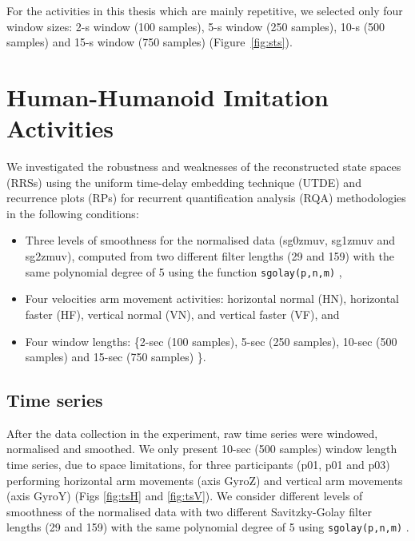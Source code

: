 For the activities in this thesis which are mainly repetitive, we selected 
only four window sizes: 2-s window (100 samples), 5-s window (250 samples), 
10-s (500 samples) and 15-s window (750 samples) (Figure~\ref{fig:sts}).




\section{Human-Humanoid Imitation Activities} %
We investigated the robustness and weaknesses of the reconstructed state spaces (RRSs) 
using the uniform time-delay embedding technique (UTDE) 
and recurrence plots (RPs) for recurrent quantification analysis (RQA) 
methodologies in the following conditions: 
\begin{itemize}

\item Three levels of smoothness for the normalised data (sg0zmuv, sg1zmuv and sg2zmuv), 
	computed from two different filter lengths (29 and 159) with the same polynomial degree 
	of 5 using the function \texttt{sgolay(p,n,m)} \cite{Rsignal},

\item Four velocities arm movement activities: 
	horizontal normal (HN), horizontal faster (HF), vertical normal (VN), and vertical faster (VF),
	and

\item Four window lengths: \{2-sec (100 samples), 5-sec (250 samples), 
	10-sec (500 samples) and 15-sec (750 samples) \}.

\end{itemize}





\subsection{Time series}
After the data collection in the experiment, raw time series were windowed, normalised and smoothed.
We only present 10-sec (500 samples) window length time series, due to space limitations, 
for three participants (p01, p01 and p03) performing horizontal arm movements (axis GyroZ) 
and vertical arm movements (axis GyroY) (Figs \ref{fig:tsH} and \ref{fig:tsV}).
We consider different levels of smoothness of the normalised data 
with two different Savitzky-Golay filter lengths (29 and 159) 
with the same polynomial degree of 5 using \texttt{sgolay(p,n,m)} \cite{Rsignal}.
 

